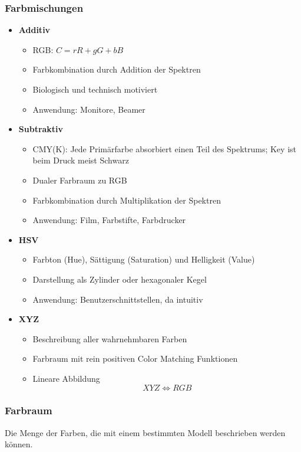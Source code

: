 \subsubsection{Farbmischungen}
\begin{itemize}
	\item \textbf{Additiv}
	\begin{itemize}
		\item RGB: \(C=rR+gG+bB\)
		\item Farbkombination durch Addition der Spektren
		\item Biologisch und technisch motiviert
		\item Anwendung: Monitore, Beamer
	\end{itemize}
	\item \textbf{Subtraktiv}
	\begin{itemize}
		\item CMY(K): Jede Primärfarbe absorbiert einen Teil des Spektrums; Key ist beim Druck meist Schwarz
		\item Dualer Farbraum zu RGB
		\item Farbkombination durch Multiplikation der Spektren
		\item Anwendung: Film, Farbstifte, Farbdrucker
	\end{itemize}
	\item \textbf{HSV}
	\begin{itemize}
		\item Farbton (Hue), Sättigung (Saturation) und Helligkeit (Value)
		\item Darstellung als Zylinder oder hexagonaler Kegel
		\item Anwendung: Benutzerschnittstellen, da intuitiv
	\end{itemize}
	\item \textbf{XYZ}
	\begin{itemize}
		\item Beschreibung aller wahrnehmbaren Farben
		\item Farbraum mit rein positiven Color Matching Funktionen
		\item Lineare Abbildung \[XYZ \Leftrightarrow RGB\]
	\end{itemize}
\end{itemize}

\subsubsection{Farbraum}
Die Menge der Farben, die mit einem bestimmten Modell beschrieben werden können.

